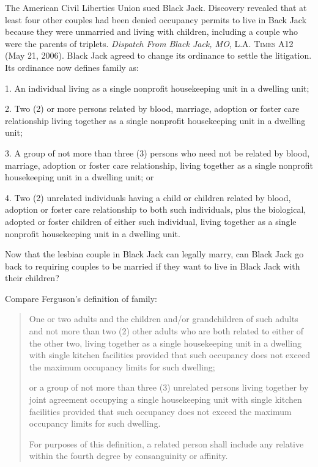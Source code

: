 The American Civil Liberties Union sued Black Jack. Discovery revealed that at
least four other couples had been denied occupancy permits to live in Back Jack
because they were unmarried and living with children, including a couple who
were the parents of triplets. \textit{Dispatch From Black Jack, MO},
\textsc{L.A. Times} A12 (May 21, 2006). Black Jack agreed to change its
ordinance to settle the litigation. Its ordinance now defines family as:
\begin{statute}
\item 1. An individual living as a single nonprofit housekeeping unit in a
dwelling unit; 

\item 2. Two (2) or more persons related by blood, marriage, adoption or foster
care relationship living together as a single nonprofit housekeeping unit in a
dwelling unit; 

\item 3. A group of not more than three (3) persons who need not be related by
blood, marriage, adoption or foster care relationship, living together as a
single nonprofit housekeeping unit in a dwelling unit; or 

\item 4. Two (2) unrelated individuals having a child or children related by
blood, adoption or foster care relationship to both such individuals, plus the
biological, adopted or foster children of either such individual, living
together as a single nonprofit housekeeping unit in a dwelling unit. 
\end{statute}
Now that the lesbian couple in Black Jack can legally marry, can Black Jack go
back to requiring couples to be married if they want to live in Black Jack with
their children?

\item
Compare Ferguson's definition of family:
\begin{quotation}
One or two adults and the children and/or grandchildren of such adults and not
more than two (2) other adults who are both related to either of the other two,
living together as a single housekeeping unit in a dwelling with single kitchen
facilities provided that such occupancy does not exceed the maximum occupancy
limits for such dwelling; 

or a group of not more than three (3) unrelated persons living together by joint
agreement occupying a single housekeeping unit with single kitchen facilities
provided that such occupancy does not exceed the maximum occupancy limits for
such dwelling. 

For purposes of this definition, a related person shall include any relative
within the fourth degree by consanguinity or affinity.
\end{quotation}

